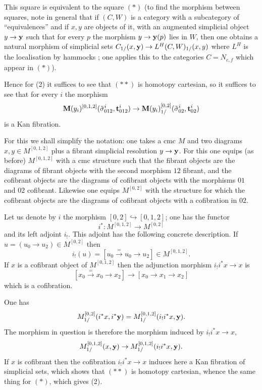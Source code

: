 This square is equivalent to the square $(\ast )$
(to find the morphism between squares, note in general that
if $(C,W)$ is a category with a subcategory of ``equivalences'' and if
$x,y$
are objects of it, with an augmented simplicial object $y\rightarrow {\bf y}$
such that for every $p$ the morphism $y\rightarrow {\bf y}(p)$ lies in $W$,
then one obtains a natural morphism of simplicial sets
$C_{1/}(x,{\bf y})\rightarrow L^H(C,W)_{1/}(x,y)$ where $L^H$ is the
localisation by hammocks \cite{DwyerKan2} \cite{DwyerKan3}; one applies this
to the
categories $C=N_{c,f}$ which appear in $(\ast )$).

Hence for (2) it suffices to see that $(\ast \ast )$ is
homotopy cartesian,
so it suffices to see that for every $i$ the morphism
$$
{\bf M} (y_i)^{[0,1,2]}(\tilde{\sigma} ^i_{012},{\bf t} ^i
_{012})\rightarrow
{\bf M} (y_i)^{[0,2]}_{1/}(\tilde{\sigma} ^i_{02},{\bf t}
^i_{02})
$$
is a Kan fibration.

For this
we shall simplify the notation: one takes a cmc $M$ and two diagrams
$x,y\in M^{[0,1,2]}$ plus a fibrant simplicial resolution $y\rightarrow
{\bf y}$. For this one equips (as before) $M^{[0,1,2]}$ with a cmc structure
such that the fibrant objects are the diagrams of fibrant objects with the
second morphism $12$ fibrant, and the cofibrant objects are the diagrams
of cofibrant objects with the morphisms $01$ and $02$ cofibrant. Likewise one
equips $M^{[0,2]}$ with the structure for which the cofibrant objects are
the diagrams of cofibrant objects with a cofibration in $02$.

Let us denote by $i$ the morphism $ [0,2]\hookrightarrow [0,1,2]$; one has the
functor
$$
i^{\ast}: M^{[0,1,2]}\rightarrow M^{[0,2]}
$$
and its left adjoint $i_!$. This adjoint has the following concrete
description. If $u= (u_0\rightarrow u_2)\in M^{[0,2]}$ then
$$
i_!(u)= [u_0 \stackrel{=}{\rightarrow} u_0 \rightarrow u_2]\in M^{[0,1,2]}.
$$
If $x$ is a cofibrant object of $M^{[0,1,2]}$ then
the adjunction morphism $i_!i^{\ast}x\rightarrow x$ is
$$
[x_0 \stackrel{=}{\rightarrow} x_0 \rightarrow x_2]
\rightarrow [x_0\rightarrow x_1\rightarrow x_2]
$$
which is a cofibration.

One has
$$
M^{[0,2]}_{1/}(i^{\ast} x, i^{\ast} {\bf y})=
M^{[0,1,2]}_{1/}(i_!i^{\ast} x, {\bf y}).
$$
The morphism in question is therefore the morphism induced by
$i_!i^{\ast}x\rightarrow x$,
$$
M^{[0,1,2]}_{1/}(x, {\bf y})
\rightarrow
M^{[0,1,2]}_{1/}(i_!i^{\ast} x, {\bf y}).
$$
If $x$ is cofibrant then the cofibration $i_!i^{\ast}x\rightarrow x$
induces here a Kan fibration of simplicial sets,
which shows that $(\ast \ast )$ is homotopy cartesian,
whence the same thing
for $(\ast )$, which gives (2).



